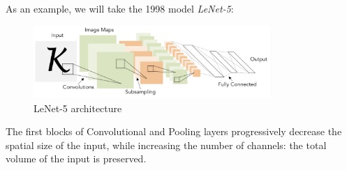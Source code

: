 As an example, we will take the 1998 model \emph{LeNet-5}:
\begin{figure}[H]
    \centering
    \includegraphics[width=0.8\textwidth]{images/lenet-5.png}
    \caption{LeNet-5 architecture}
\end{figure}
The first blocks of Convolutional and Pooling layers progressively decrease the spatial size of the input, while increasing the number of channels: the total volume of the input is preserved.
